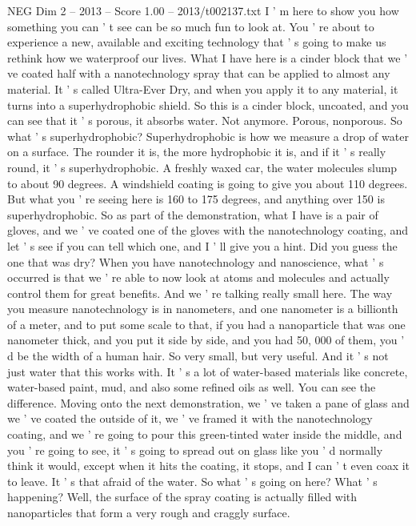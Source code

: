 \begin{textsample}{NEG Dim 2 – 2013 – Score 1.00 – 2013/t002137.txt}  \label{ex:f2_neg_029}
I ' m here to show you how something you can ' t see can be so much fun to look at.
You ' re about to experience a new, available and exciting technology that ' s going to make us rethink how we waterproof our lives.
What I have here is a cinder block that we ' ve coated half with a nanotechnology spray that can be applied to almost any material.
It ' s called Ultra-Ever Dry, and when you apply it to any material, it turns into a superhydrophobic shield.
So this is a cinder block, uncoated, and you can see that it ' s porous, it absorbs water.
Not anymore.
Porous, nonporous.
So what ' s superhydrophobic?
Superhydrophobic is how we measure a drop of water on a surface.
The rounder it is, the more hydrophobic it is, and if it ' s really round, it ' s superhydrophobic.
A freshly waxed car, the water molecules slump to about 90 degrees.
A windshield coating is going to give you about 110 degrees.
But what you ' re seeing here is 160 to 175 degrees, and anything over 150 is superhydrophobic.
So as part of the demonstration, what I have is a pair of gloves, and we ' ve coated one of the gloves with the nanotechnology coating, and let ' s see if you can tell which one, and I ' ll give you a hint.
Did you guess the one that was dry?
When you have nanotechnology and nanoscience, what ' s occurred is that we ' re able to now look at atoms and molecules and actually control them for great benefits.
And we ' re talking really small here.
The way you measure nanotechnology is in nanometers, and one nanometer is a billionth of a meter, and to put some scale to that, if you had a nanoparticle that was one nanometer thick, and you put it side by side, and you had 50, 000 of them, you ' d be the width of a human hair.
So very small, but very useful.
And it ' s not just water that this works with.
It ' s a lot of water-based materials like concrete, water-based paint, mud, and also some refined oils as well.
You can see the difference.
Moving onto the next demonstration, we ' ve taken a pane of glass and we ' ve coated the outside of it, we ' ve framed it with the nanotechnology coating, and we ' re going to pour this green-tinted water inside the middle, and you ' re going to see, it ' s going to spread out on glass like you ' d normally think it would, except when it hits the coating, it stops, and I can ' t even coax it to leave.
It ' s that afraid of the water.
So what ' s going on here?
What ' s happening?
Well, the surface of the spray coating is actually filled with nanoparticles that form a very rough and craggly surface.

\end{textsample}
